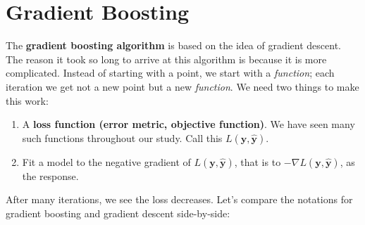 \documentclass[12pt, a4paper]{article}
\theoremstyle{definition}
\begin{document}
	\section{Gradient Boosting}
	The \textbf{gradient boosting algorithm} is based on the idea of gradient descent.
	The reason it took so long to arrive at this algorithm is because it
	is more complicated. Instead of starting with a point, we start with
	a \textit{function}; each iteration we get not a new point but a new
	\textit{function}. We need two things to make this work:
	\begin{enumerate}[label=(\textbf{\arabic*})]
		\item A \textbf{loss function (error metric, objective function)}.
		We have seen many such functions throughout our study. Call this
		$L(\bm{y}, \hat{\bm{y}})$.
		\item Fit a model to the negative gradient of $L(\bm{y}, \hat{\bm{y}})$,
		that is to $-\nabla L(\bm{y}, \hat{\bm{y}})$,
		as the response.
	\end{enumerate}
	After many iterations, we see the loss decreases. Let's compare the
	notations for gradient boosting and gradient descent side-by-side:
\end{document}
